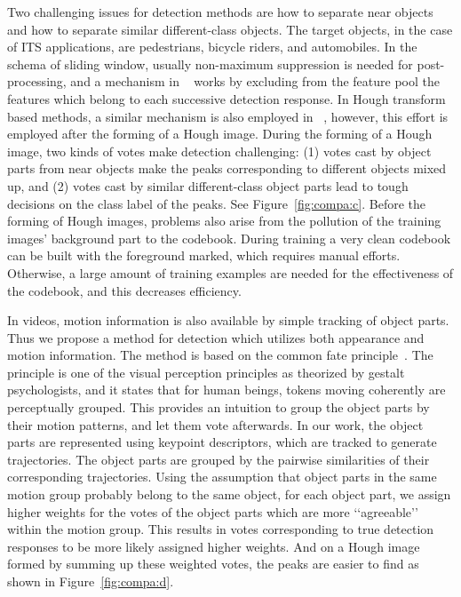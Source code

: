 Two challenging issues for detection methods are how to separate near objects and how to separate similar different-class objects. The target objects, in the case of ITS applications, are pedestrians, bicycle riders, and automobiles. In the schema of sliding window, usually  non-maximum suppression is needed for post-processing, and a mechanism in ~\citep{ac4} works by excluding from the feature pool the features which belong to each successive detection response. In Hough transform based methods, a similar mechanism is also employed in ~\citep{ac9}, however, this effort is employed after the forming of a Hough image. During the forming of a Hough image, two kinds of votes make detection challenging: (1) votes cast by object parts from near objects make the peaks corresponding to different objects mixed up, and (2) votes cast by similar different-class object parts lead to tough decisions on the class label of the peaks. See Figure~\ref{fig:compa:c}. Before the forming of Hough images, problems also arise from the pollution of the training images' background part to the codebook. During training a very clean codebook can be built with the foreground marked, which requires manual efforts. Otherwise, a large amount of training examples are needed for the effectiveness of the codebook, and this decreases efficiency.


In videos, motion information is also available by simple tracking of object parts. Thus we propose a method for detection which utilizes both appearance and motion information. The method is based on the common fate principle~\citep{ac13}. The principle is one of the visual perception principles as theorized by gestalt psychologists, and it states that for human beings, tokens moving coherently are perceptually grouped. This provides an intuition to group the object parts by their motion patterns, and let them vote afterwards. In our work, the object parts are represented using keypoint descriptors, which are tracked to generate trajectories. The object parts are grouped by the pairwise similarities of their corresponding trajectories. Using the assumption that object parts in the same motion group  probably belong to the same object, for each object part, we assign higher weights for the votes of the object parts which are more {\lq\lq}agreeable{\rq\rq} within the motion group. This results in votes corresponding to true detection responses to be more likely assigned higher weights. And on a Hough image formed by summing up these weighted votes, the peaks are easier to find as shown in Figure~\ref{fig:compa:d}.







